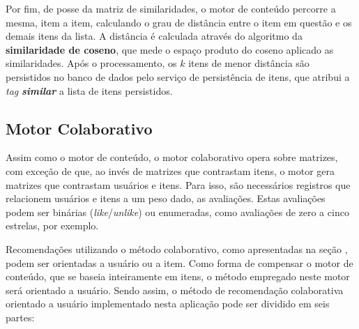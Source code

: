 \documentclass[12pt, openright, oneside, a4paper, brazil]{abntex2}
\begin{document}
Por fim, de posse da matriz de similaridades, o motor de conteúdo percorre a mesma, item a item, calculando o grau de distância entre o item em questão e os demais itens da lista. A distância é calculada através do algoritmo da \textbf{similaridade de coseno}, que mede o espaço produto do coseno aplicado as similaridades. Após o processamento, os $k$ itens de menor distância são persistidos no banco de dados pelo serviço de persistência de itens, que atribui a \textit{tag} \textbf{\textit{similar}} a lista de itens persistidos.

\subsection{Motor Colaborativo} \label{motor:colaborativo}

Assim como o motor de conteúdo, o motor colaborativo opera sobre matrizes, com exceção de que, ao invés de matrizes que contrastam itens, o motor gera matrizes que contrastam usuários e itens. Para isso, são necessários registros que relacionem usuários e itens a um peso dado, as avaliações. Estas avaliações podem ser binárias (\textit{like}/\textit{unlike}) ou enumeradas, como avaliações de zero a cinco estrelas, por exemplo.

Recomendações utilizando o método colaborativo, como apresentadas na seção , podem ser orientadas a usuário ou a item. Como forma de compensar o motor de conteúdo, que se baseia inteiramente em itens, o método empregado neste motor será orientado a usuário. Sendo assim, o método de recomendação colaborativa orientado a usuário implementado nesta aplicação pode ser dividido em seis partes:
\end{document}
